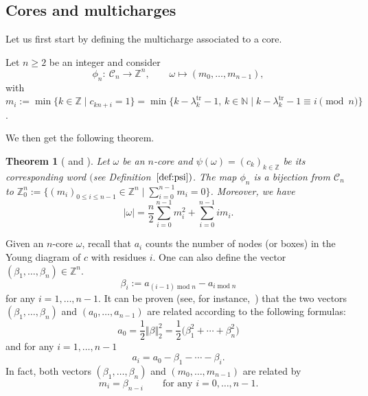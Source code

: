 \documentclass[pdftex]{sigma}
\newtheorem{Theorem}{Theorem}[section]
\numberwithin{equation}{section}
\newcommand{\cC}{\mathcal{C}}
\newcommand{\Z}{\mathbb{Z}}
\newcommand{\N}{\mathbb{N}}
\newcommand{\func}[1]{\operatorname{#1}}
\begin{document}
\subsection{Cores and multicharges}

Let us first start by defining the multicharge associated to a core.

\begin{Definition}
	\label{defgks} Let $n\geq 2$ be an integer and consider
	\begin{equation*}
	\phi _{n}\colon \ \mathcal{C}_{n}   \rightarrow   \Z^{n}, \qquad
	  \omega   \mapsto   (m_{0},\dots ,m_{n-1}),
	\end{equation*}
	with $m_{i}:=\min \{k\in \Z\mid c_{kn+i}=1\}=\min \bigl\{k-\lambda _{k}^{\mathrm{tr}}-1,\, k\in \N\mid k-\lambda _{k}^{\mathrm{tr}}-1\equiv i\pmod{n}\bigr\}$.
\end{Definition}

We then get the following theorem.

\begin{Theorem}[{\cite[Theorem $2.10$]{Johnson}} and {\cite[Bijection $2$]{GKS}}]\label{thm:gk}
    Let $\omega $ be an $n$-core and $\psi (\omega )=( c_{k}) _{k\in \Z}$
	be its corresponding word $($see Definition~$\ref{def:psi})$. The map $\phi _{n}$
	is a bijection from $\cC_{n}$ to {$\Z_{0}^{n}:=\bigl\{(m_{i})_{0\leq i\leq n-1}\in %
	\Z^{n}\mid \sum_{i=0}^{n-1}m_{i}=0\bigr\}$}. Moreover, we have
	\begin{equation*}
	\lvert \omega \rvert =\frac{n}{2}\sum_{i=0}^{n-1}m_{i}^{2}+%
	\sum_{i=0}^{n-1}im_{i}. %
	\end{equation*}
\end{Theorem}

Given an $n$-core $\omega $, recall that $a_{i}$ counts the number of nodes
(or boxes) in the Young diagram of $c$ with residues $i$. One can also
define the vector $(\beta _{1},\dots ,\beta _{n})\in \mathbb{Z}^{n}$.
\begin{equation}
\beta _{i}:=a_{(i-1)\func{mod}n}-a_{i\func{mod}n} \label{eq:beta_a}
\end{equation}
for any $i=1,\dots ,n-1$.
It can be proven (see, for instance,~\cite{Rost}) that the two vectors $%
(\beta _{1},\dots ,\beta _{n})$ and $(a_{0},\dots ,a_{n-1})$ are related
according to the following formulas:
\begin{equation*}
a_{0}=\frac{1}{2} \Vert \beta  \Vert _{2}^{2}=\frac{1}{2}\bigl(\beta
_{1}^{2}+\cdots +\beta _{n}^{2}\bigr)
\end{equation*}
and for any $i=1,\dots ,n-1$
\begin{equation*}
a_{i}=a_{0}-\beta _{1}-\cdots -\beta _{i}.
\end{equation*}
In fact, both vectors $(\beta _{1},\dots ,\beta _{n})$ and $
(m_{0},\dots ,m_{n-1})$ are related by%
\begin{equation*}
m_{i}=\beta _{n-i}\qquad \text{for any }i=0,\dots ,n-1.
\end{equation*}
\end{document}
